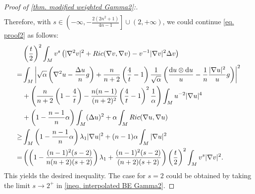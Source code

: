 \documentclass[10pt,a4paper]{amsart}
\newcommand{\dd}{\mathop{}\!\mathrm{d}}%
\begin{document}
\begin{proof}[Proof of \cref{thm. modified weighted Gamma2}:]
\begin{align*}
 \end{align*}
 Therefore, with $s\in\left(-\infty,-\frac{2(2n^2+1)}{4n-1}\right]\cup(2,+\infty)$, we could continue \cref{eq. proof2} as follows:
 \begin{align*}
     & \left(\frac{t}{2}\right)^2
     \int_{M} v^s
     \left(|\nabla^2 v|^2
     +Ric(\nabla v,\nabla v)
     -v^{-1}|\nabla v|^2\Delta v
     \right)\\
     =&\int_M \left|\sqrt{\alpha}
     \left(\nabla^2 u-\frac{\Delta u}{n}g\right)
     +\frac{n}{n+2}\left(\frac{4}{t}-1\right)\frac{1}{\sqrt{\alpha}}
     \left(\frac{\dd u\otimes \dd u}{u}-\frac{1}{n}\frac{|\nabla u|^2}{u}g\right)\right|^2
     \notag\\
     &+\left(
     \frac{n}{n+2}\left(1-\frac{4}{t}\right)
     -\frac{n(n-1)}{(n+2)^2}\left(\frac{4}{t}-1\right)^2\frac{1}{\alpha}
     \right)
     \int_M u^{-2}|\nabla u|^4\notag
     \\
     &+\left(1-\frac{n-1}{n}\alpha\right)
     \int_M (\Delta u)^2
     +\alpha \int_M Ric(\nabla u,\nabla u)\\
     \geq& \int_M \left(1-\frac{n-1}{n}\alpha\right)\lambda_1|\nabla u|^2
     +(n-1)\alpha\int_M |\nabla u|^2\\
     =&\left(\left(1-\frac{(n-1)^2(s-2)}{n(n+2)(s+2)}
        \right)\lambda_1
        +\frac{(n-1)^2(s-2)}{(n+2)(s+2)}
        \right)
        \left(\frac{t}{2}\right)^2
        \int_M v^s|\nabla v|^2.
 \end{align*}
This yields the desired inequality.
 The case for $s=2$ could be obtained by taking the limit $s\to 2^+$ in \cref{ineq. interpolated BE Gamma2}. 

\end{proof}
\end{document}
